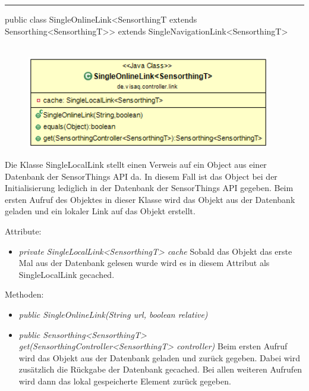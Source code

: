 \rule{\textwidth}{0.4pt}
public class SingleOnlineLink<SensorthingT extends Sensorthing<SensorthingT>> extends SingleNavigationLink<SensorthingT>
\\\\
\begin{minipage}{0.5\textwidth}
    \begin{figure}[H]
        {\centering\includegraphics[width=0.95\textwidth]{media/backend/controller/classes/SingleOnlineLink.png}}
    \end{figure}
    \end{minipage} \hfill
\begin{minipage}{0.5\textwidth}
    Die Klasse SingleLocalLink stellt einen Verweis auf ein Object aus einer Datenbank der \gls{SensorThings API} da.
    In diesem Fall ist das Object bei der Initialisierung lediglich in der Datenbank der \gls{SensorThings API} gegeben.
    Beim ersten Aufruf des Objektes in dieser Klasse wird das Objekt aus der Datenbank geladen und ein lokaler Link auf das Objekt erstellt.
\end{minipage}

Attribute:
\begin{itemize}
    \item \emph{private SingleLocalLink<SensorthingT> cache} Sobald das Objekt das erste Mal aus der Datenbank gelesen wurde wird es in diesem Attribut als SingleLocalLink gecached.
\end{itemize}
Methoden:
\begin{itemize}
    \item \emph{public SingleOnlineLink(String url, boolean relative)}
    \relativeDescription
    \item \emph{public Sensorthing<SensorthingT> get(SensorthingController<SensorthingT> controller)}
    Beim ersten Aufruf wird das Objekt aus der Datenbank geladen und zurück gegeben.
    Dabei wird zusätzlich die Rückgabe der Datenbank gecached.
    Bei allen weiteren Aufrufen wird dann das lokal gespeicherte Element zurück gegeben.
\end{itemize}

